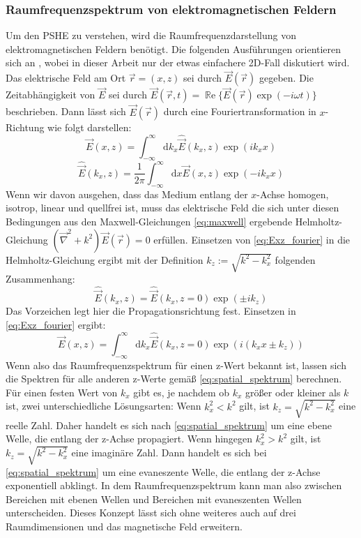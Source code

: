 \documentclass[titlepage]{article}
\renewcommand{\Re}{\operatorname{\mathbb{R}e}}
\begin{document}
	\subsubsection{Raumfrequenzspektrum von elektromagnetischen Feldern}
	Um den PSHE zu verstehen, wird die Raumfrequenzdarstellung von elektromagnetischen Feldern benötigt. Die folgenden Ausführungen orientieren sich an \cite{Novotny.2012b}, wobei in dieser Arbeit nur der etwas einfachere 2D-Fall diskutiert wird.\\		
	Das elektrische Feld am Ort $\vec{r} = (x, z) $ sei durch $\vec{E}({\vec{r}})$ gegeben.
	Die Zeitabhängigkeit von $\vec{E}$ sei durch $\vec{E}({\vec{r}, t})=\Re\{\vec{E}({\vec{r}})\exp(-i\omega t)\}$ beschrieben. Dann lässt sich $\vec{E}({\vec{r}})$ durch eine Fouriertransformation in $x$-Richtung wie folgt darstellen:
	\begin{equation}
		\label{eq:Exz_fourier}
		\vec{E}(x,z) = \int_{-\infty}^{\infty}\mathrm{d}{k_x}\hat{\vec{E}}(k_x,z)\exp(ik_xx)				
	\end{equation}
	\begin{equation}
		\label{eq:EKxz_fourier}
		\hat{\vec{E}}(k_x,z) = \dfrac{1}{2\pi}\int_{-\infty}^{\infty}\mathrm{d}x\vec{E}(x,z)\exp(-ik_xx)
	\end{equation}
	Wenn wir davon ausgehen, dass das Medium entlang der $x$-Achse homogen, isotrop, linear und quellfrei ist, muss das elektrische Feld die sich unter diesen Bedingungen aus den Maxwell-Gleichungen \eqref{eq:maxwell} ergebende Helmholtz-Gleichung $(\vec{\nabla}^2+k^2)\vec{E}({\vec{r}}) = 0$ erfüllen. Einsetzen von \eqref{eq:Exz_fourier} in die Helmholtz-Gleichung ergibt mit der Definition $k_z := \sqrt{k^2-k_x^2}$ folgenden Zusammenhang:
	\begin{equation}
		\label{eq:spatial_spektrum}
		\hat{\vec{E}}(k_x,z) =\hat{\vec{E}}(k_x,z= 0) \exp(\pm ik_ z)
	\end{equation}
	Das Vorzeichen legt hier die Propagationsrichtung fest.
	Einsetzen in \eqref{eq:Exz_fourier} ergibt:
	\begin{equation}
		\label{eq:Espatial_spektrum}
		\vec{E}(x,z) = \int_{-\infty}^{\infty}\mathrm{d}{k_x}\hat{\vec{E}}(k_x,z= 0)\exp(i(k_xx\pm k_ z))
	\end{equation}
	Wenn also das Raumfrequenzspektrum für einen z-Wert bekannt ist, lassen sich die Spektren für alle anderen z-Werte gemäß \eqref{eq:spatial_spektrum} berechnen. Für einen festen Wert von $k_x$ gibt es, je nachdem ob $k_x$ größer oder kleiner als $k$ ist, zwei unterschiedliche Lösungsarten: Wenn $k_x^2 < k^2$ gilt, ist $k_z = \sqrt{k^2-k_x^2}$ eine reelle Zahl. Daher handelt es sich nach \eqref{eq:spatial_spektrum} um eine ebene Welle, die entlang der z-Achse propagiert.
	Wenn hingegen $k_x^2 > k^2$ gilt, ist $k_z = \sqrt{k^2-k_x^2}$ eine imaginäre Zahl. Dann handelt es sich bei \eqref{eq:spatial_spektrum} um eine evaneszente Welle, die entlang der z-Achse exponentiell abklingt. In dem Raumfrequenzspektrum kann man also zwischen Bereichen mit ebenen Wellen und Bereichen mit evaneszenten Wellen unterscheiden. Dieses Konzept lässt sich ohne weiteres auch auf drei Raumdimensionen und das magnetische Feld erweitern.
\end{document}

